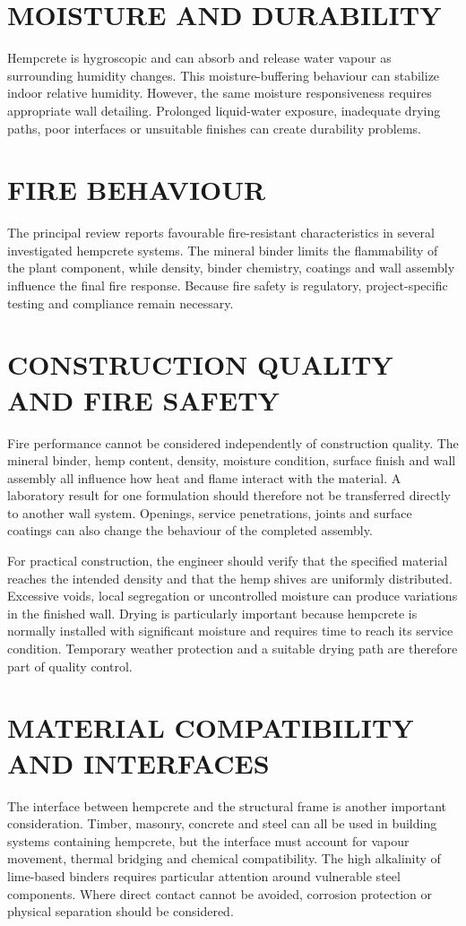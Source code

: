 \documentclass[12pt,a4paper,final]{report}
\begin{document}
\section[Moisture and Durability]{MOISTURE AND DURABILITY}
Hempcrete is hygroscopic and can absorb and release water vapour as surrounding humidity
changes. This moisture-buffering behaviour can stabilize indoor relative humidity. However,
the same moisture responsiveness requires appropriate wall detailing. Prolonged liquid-water
exposure, inadequate drying paths, poor interfaces or unsuitable finishes can create durability
problems.

\section[Fire Behaviour]{FIRE BEHAVIOUR}
The principal review reports favourable fire-resistant characteristics in several investigated
hempcrete systems. The mineral binder limits the flammability of the plant component, while
density, binder chemistry, coatings and wall assembly influence the final fire response.
Because fire safety is regulatory, project-specific testing and compliance remain necessary.

\section[Construction Quality and Fire Safety]{CONSTRUCTION QUALITY AND FIRE SAFETY}
Fire performance cannot be considered independently of construction quality. The mineral
binder, hemp content, density, moisture condition, surface finish and wall assembly all
influence how heat and flame interact with the material. A laboratory result for one
formulation should therefore not be transferred directly to another wall system. Openings,
service penetrations, joints and surface coatings can also change the behaviour of the
completed assembly.

For practical construction, the engineer should verify that the specified material reaches the
intended density and that the hemp shives are uniformly distributed. Excessive voids, local
segregation or uncontrolled moisture can produce variations in the finished wall. Drying is
particularly important because hempcrete is normally installed with significant moisture and
requires time to reach its service condition. Temporary weather protection and a suitable
drying path are therefore part of quality control.

\section[Material Compatibility and Interfaces]{MATERIAL COMPATIBILITY AND INTERFACES}
The interface between hempcrete and the structural frame is another important consideration.
Timber, masonry, concrete and steel can all be used in building systems containing hempcrete,
but the interface must account for vapour movement, thermal bridging and chemical
compatibility. The high alkalinity of lime-based binders requires particular attention around
vulnerable steel components. Where direct contact cannot be avoided, corrosion protection or
physical separation should be considered.
\end{document}
